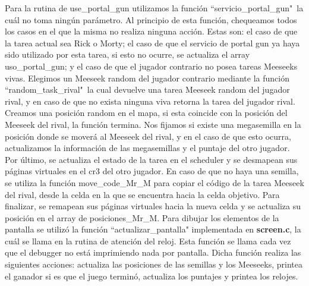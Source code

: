 \documentclass[a4paper]{article}
\begin{document}
\justify
Para la rutina de use_portal_gun utilizamos la función ``servicio_portal_gun"\, la cuál no toma ningún parámetro. Al principio de esta función, chequeamos todos los casos en el que la misma no realiza ninguna acción. Estas son: el caso de que la tarea actual sea Rick o Morty; el caso de que el servicio de portal gun ya haya sido utilizado por esta tarea, si esto no ocurre, se actualiza el array uso_portal_gun; y el caso de que el jugador contrario no posea tareas Meeseeks vivas. Elegimos un Meeseek random del jugador contrario mediante la función ``random_task_rival"\, la cual devuelve una tarea Meeseek random del jugador rival, y en caso de que no exista ninguna viva retorna la tarea del jugador rival. Creamos una posición random en el mapa, si esta coincide con la posición del Meeseek del rival, la función termina. Nos fijamos si existe una megasemilla en la posición donde se moverá al Meeseek del rival, y en el caso de que esto ocurra, actualizamos la información de las megasemillas y el puntaje del otro jugador. Por último, se actualiza el estado de la tarea en el scheduler y se desmapean sus páginas virtuales en el cr3 del otro jugador. En caso de que no haya una semilla, se utiliza la función move_code_Mr_M para copiar el código de la tarea Meeseek del rival, desde la celda en la que se encuentra hacia la celda objetivo. Para finalizar, se remapean sus páginas virtuales hacia la nueva celda y se actualiza su posición en el array de posiciones_Mr_M.
\justify
Para dibujar los elementos de la pantalla se utilizó la función ``actualizar_pantalla" implementada en \textbf{screen.c}, la cuál se llama en la rutina de atención del reloj. Esta función se llama cada vez que el debugger no está imprimiendo nada por pantalla. Dicha función realiza las siguientes acciones: actualiza las posiciones de las semillas y los Meeseeks, printea el ganador si es que el juego terminó, actualiza los puntajes y printea los relojes.
\end{document}
